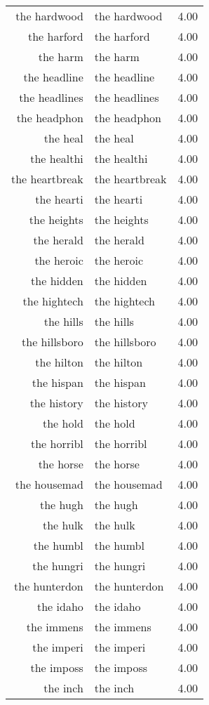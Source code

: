 \begin{table}[ht]
\begin{tabular}{rlr}
  the hardwood & the hardwood & 4.00 \\ 
  the harford & the harford & 4.00 \\ 
  the harm & the harm & 4.00 \\ 
  the headline & the headline & 4.00 \\ 
  the headlines & the headlines & 4.00 \\ 
  the headphon & the headphon & 4.00 \\ 
  the heal & the heal & 4.00 \\ 
  the healthi & the healthi & 4.00 \\ 
  the heartbreak & the heartbreak & 4.00 \\ 
  the hearti & the hearti & 4.00 \\ 
  the heights & the heights & 4.00 \\ 
  the herald & the herald & 4.00 \\ 
  the heroic & the heroic & 4.00 \\ 
  the hidden & the hidden & 4.00 \\ 
  the hightech & the hightech & 4.00 \\ 
  the hills & the hills & 4.00 \\ 
  the hillsboro & the hillsboro & 4.00 \\ 
  the hilton & the hilton & 4.00 \\ 
  the hispan & the hispan & 4.00 \\ 
  the history & the history & 4.00 \\ 
  the hold & the hold & 4.00 \\ 
  the horribl & the horribl & 4.00 \\ 
  the horse & the horse & 4.00 \\ 
  the housemad & the housemad & 4.00 \\ 
  the hugh & the hugh & 4.00 \\ 
  the hulk & the hulk & 4.00 \\ 
  the humbl & the humbl & 4.00 \\ 
  the hungri & the hungri & 4.00 \\ 
  the hunterdon & the hunterdon & 4.00 \\ 
  the idaho & the idaho & 4.00 \\ 
  the immens & the immens & 4.00 \\ 
  the imperi & the imperi & 4.00 \\ 
  the imposs & the imposs & 4.00 \\ 
  the inch & the inch & 4.00 \\ 

\end{tabular}
\end{table}

